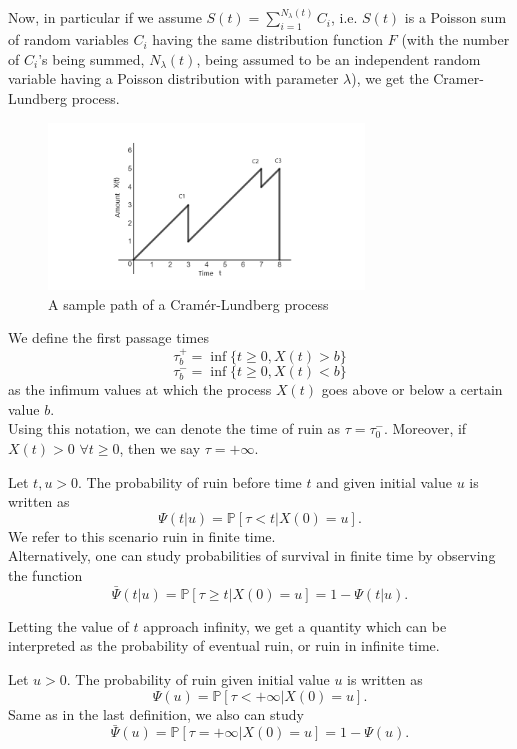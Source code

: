 Now, in particular if we assume $S(t) = \sum_{i=1}^{N_{\lambda}(t)} C_i$, i.e. $S(t)$ is a Poisson sum of random variables $C_i$ having the same distribution function $F$ (with the number of $C_i$'s being summed, $N_{\lambda}(t)$, being assumed to be an independent random variable having a Poisson distribution with parameter $\lambda$), we get the Cramer-Lundberg process.
\begin{figure}
\caption{A sample path of a Cram\'er-Lundberg process}
\begin{center}
\includegraphics [width=3.3in]{CL1-1.png}
\end{center}
\end{figure}

We define the first passage times
\[ \tau_b^+ = \inf\{ t \geq 0, X(t) > b\}\]
\[ \tau_b^- = \inf\{ t \geq 0, X(t) < b\}\]
as the infimum values at which the process $X(t)$ goes above or below a certain value $b$.\\
Using this notation, we can denote the time of ruin as $\tau = \tau_0^-$. Moreover, if $X(t) > 0$ $\forall t\geq 0$, then we say $\tau = + \infty$.

Let $t, u >0$. The probability of ruin before time $t$ and given initial value $u$ is written as
\[\Psi(t|u) = \mathbb{P} [\tau < t | X(0)=u ].  \]
We refer to this scenario ruin in finite time.\\

Alternatively, one can study probabilities of survival in finite time by observing the function
\[ \bar {\Psi} (t|u) = \mathbb{P} [\tau \geq t | X(0)=u ] = 1 - \Psi (t|u) . \]

Letting the value of $t$ approach infinity, we get a quantity which can be interpreted as the probability of eventual ruin, or ruin in infinite time.

Let $u >0$. The probability of ruin given initial value $u$ is written as
\[\Psi(u) = \mathbb{P} [\tau < +\infty | X(0)=u ]. \]
Same as in the last definition, we also can study
\[ \bar {\Psi} (u) = \mathbb{P} [\tau = + \infty | X(0)=u ] = 1 - \Psi (u). \]

